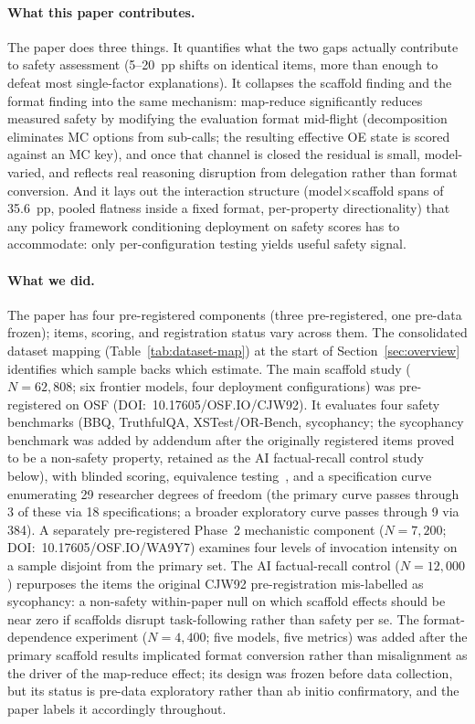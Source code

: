 \paragraph{What this paper contributes.}
The paper does three things.  It quantifies what the two gaps actually contribute to safety assessment (5--20~pp shifts on identical items, more than enough to defeat most single-factor explanations).  It collapses the scaffold finding and the format finding into the same mechanism: map-reduce significantly reduces measured safety by modifying the evaluation format mid-flight (decomposition eliminates MC options from sub-calls; the resulting effective OE state is scored against an MC key), and once that channel is closed the residual is small, model-varied, and reflects real reasoning disruption from delegation rather than format conversion.  And it lays out the interaction structure (model$\times$scaffold spans of 35.6~pp, pooled flatness inside a fixed format, per-property directionality) that any policy framework conditioning deployment on safety scores has to accommodate: only per-configuration testing yields useful safety signal.

\paragraph{What we did.}
The paper has four pre-registered components (three pre-registered, one pre-data frozen); items, scoring, and registration status vary across them.  The consolidated dataset mapping (Table~\ref{tab:dataset-map}) at the start of Section~\ref{sec:overview} identifies which sample backs which estimate.  The main scaffold study ($N = 62{,}808$; six frontier models, four deployment configurations) was pre-registered on OSF (DOI:~10.17605/OSF.IO/CJW92).  It evaluates four safety benchmarks (BBQ, TruthfulQA, XSTest/OR-Bench, sycophancy; the sycophancy benchmark was added by addendum after the originally registered items proved to be a non-safety property, retained as the AI factual-recall control study below), with blinded scoring, equivalence testing~\cite{schuirmann1987tost, lakens2017equivalence}, and a specification curve enumerating 29 researcher degrees of freedom (the primary curve passes through 3 of these via 18 specifications; a broader exploratory curve passes through 9 via 384).  A separately pre-registered Phase~2 mechanistic component ($N = 7{,}200$; DOI:~10.17605/OSF.IO/WA9Y7) examines four levels of invocation intensity on a sample disjoint from the primary set.  The AI factual-recall control ($N = 12{,}000$) repurposes the items the original CJW92 pre-registration mis-labelled as sycophancy: a non-safety within-paper null on which scaffold effects should be near zero if scaffolds disrupt task-following rather than safety per se.  The format-dependence experiment ($N = 4{,}400$; five models, five metrics) was added after the primary scaffold results implicated format conversion rather than misalignment as the driver of the map-reduce effect; its design was frozen before data collection, but its status is pre-data exploratory rather than ab initio confirmatory, and the paper labels it accordingly throughout.

